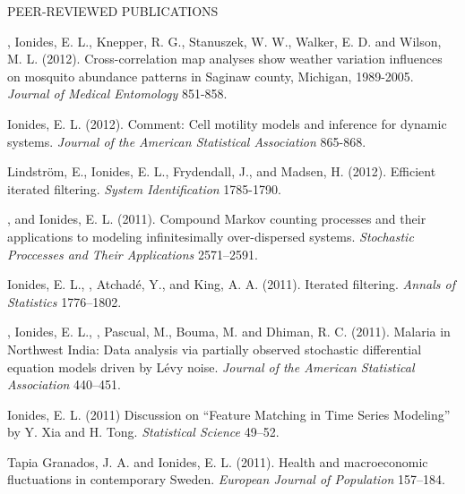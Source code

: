 \begin{reflist}{PEER-REVIEWED PUBLICATIONS}
\item\formal{[[\chuangJME] ] }
, Ionides, E. L., Knepper, R. G., Stanuszek, W. W., Walker, E. D. and Wilson, M. L. (2012).
Cross-correlation map analyses show weather variation influences on mosquito abundance patterns in Saginaw county, Michigan, 1989-2005. {\em Journal of Medical Entomology} {}{\separator}851-858.

\item\formal{[[\ionidesJASA] ]}
Ionides, E. L. (2012). Comment: Cell motility models and inference for dynamic systems. {\em Journal of the American Statistical Association} {}{\separator}865-868.

\item\formal{[[\lindstromIFAC] ]} 
Lindstr\"{o}m, E., Ionides, E. L., Frydendall, J., and Madsen, H. (2012). Efficient iterated filtering. 
{\em System Identification} {}{\separator}1785-1790.

\item\formal{[[\bretoSPA] ]}
 , and Ionides, E. L. (2011). Compound Markov counting processes and their applications to modeling infinitesimally over-dispersed systems. {\em Stochastic Proccesses and Their Applications} {}{\separator}2571--2591.

\item\formal{[[\ionidesAOS] ]}
 Ionides, E. L., , Atchad\'{e}, Y., and King, A. A. (2011). Iterated filtering. {\em Annals of Statistics} {}{\separator}1776--1802.

\item\formal{[[\bhadraJASA] ]} , Ionides, E. L., , Pascual, M., Bouma, M. and Dhiman, R. C. (2011).
Malaria in Northwest India: Data analysis via partially observed stochastic differential equation models driven by L\'{e}vy noise. {\em Journal of the American Statistical Association} {}{\separator}440--451.

\item\formal{[[\ionidesSTATSCI] ]} Ionides, E. L. (2011) Discussion on ``Feature Matching in Time Series Modeling'' by Y. Xia and H. Tong.  {\em Statistical Science} {}{\separator}49--52.

\item\formal{[[\tapiaEJP] ]} Tapia Granados, J. A. and Ionides, E. L. (2011). Health and macroeconomic fluctuations in contemporary Sweden. {\em European Journal of Population} {}{\separator}157--184.




\end{reflist}
